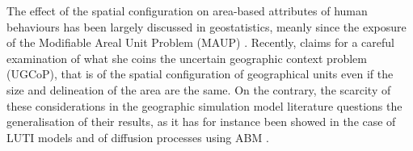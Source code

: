 \documentclass[Afour,sageh,times]{sagej}
\begin{document}
The effect of the spatial configuration on area-based attributes of human behaviours has been largely discussed in geostatistics, meanly since the exposure of the Modifiable Areal Unit Problem (MAUP) \citep{Openshaw1984,FotheringhamWong1991}. Recently, \citet{Kwan2012} claims for a careful examination of what she coins the uncertain geographic context problem (UGCoP), that is of the spatial configuration of geographical units even if the size and delineation of the area are the same. On the contrary, the scarcity of these considerations in the geographic simulation model literature questions the generalisation of their results, as it has for instance been showed in the case of LUTI models \citep{Thomasetal2017} and of diffusion processes using ABM \citep{LeTexierCaruso2017}. 

\end{document}
